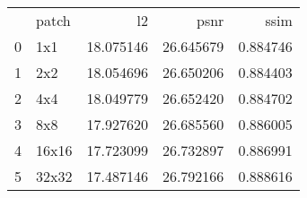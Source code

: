 \begin{tabular}{llrrr}
 & patch & l2 & psnr & ssim \\
0 & 1x1 & 18.075146 & 26.645679 & 0.884746 \\
1 & 2x2 & 18.054696 & 26.650206 & 0.884403 \\
2 & 4x4 & 18.049779 & 26.652420 & 0.884702 \\
3 & 8x8 & 17.927620 & 26.685560 & 0.886005 \\
4 & 16x16 & 17.723099 & 26.732897 & 0.886991 \\
5 & 32x32 & 17.487146 & 26.792166 & 0.888616 \\
\end{tabular}

